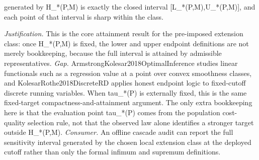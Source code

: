 \documentclass{article}
\begin{document}
generated by H_*(P,M) is exactly the closed interval [L_*(P,M),U_*(P,M)], and each point of that interval is sharp within the class.
\par\smallskip\noindent \textit{Justification.} This is the core attainment result for the pre-imposed extension class: once H_*(P,M) is fixed, the lower and upper endpoint definitions are not merely bookkeeping, because the full interval is attained by admissible representatives. \textit{Gap.} ArmstrongKolesar2018OptimalInference studies linear functionals such as a regression value at a point over convex smoothness classes, and KolesarRothe2018DiscreteRD applies honest endpoint logic to fixed-cutoff discrete running variables. When tau_*(P) is externally fixed, this is the same fixed-target compactness-and-attainment argument. The only extra bookkeeping here is that the evaluation point tau_*(P) comes from the population cost-quality selection rule, not that the observed law alone identifies a stronger target outside H_*(P,M). \textit{Consumer.} An offline cascade audit can report the full sensitivity interval generated by the chosen local extension class at the deployed cutoff rather than only the formal infimum and supremum definitions.
\end{document}
